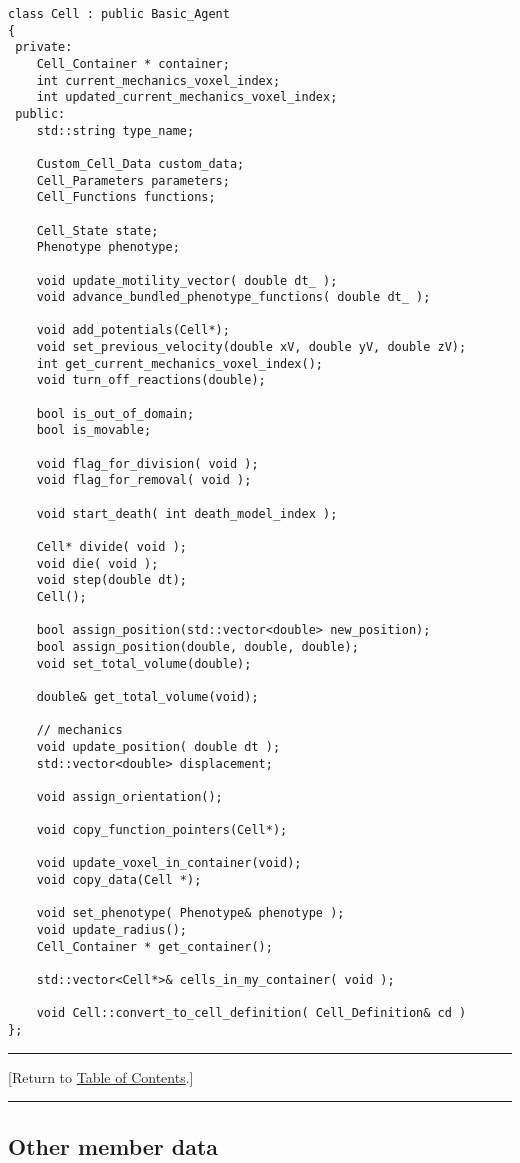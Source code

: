 \documentclass[12pt]{article}
\newcommand{\TOClink}{\begin{center}\hrule\vskip-10pt\phantom{.}\hfill[Return to \hyperlink{TOC}{Table of Contents}.]\hfill\phantom{.}\vskip3pt\hrule\end{center}}
\begin{document}
\begin{verbatim}
class Cell : public Basic_Agent 
{
 private: 
    Cell_Container * container;
    int current_mechanics_voxel_index;
    int updated_current_mechanics_voxel_index; 
 public:
    std::string type_name; 
 
    Custom_Cell_Data custom_data;
    Cell_Parameters parameters;
    Cell_Functions functions; 

    Cell_State state; 
    Phenotype phenotype; 
    
    void update_motility_vector( double dt_ );
    void advance_bundled_phenotype_functions( double dt_ ); 
    
    void add_potentials(Cell*);
    void set_previous_velocity(double xV, double yV, double zV);
    int get_current_mechanics_voxel_index();
    void turn_off_reactions(double);  
    
    bool is_out_of_domain;
    bool is_movable;
    
    void flag_for_division( void );   
    void flag_for_removal( void );   
	
    void start_death( int death_model_index ); 

    Cell* divide( void );
    void die( void );
    void step(double dt);
    Cell();
    
    bool assign_position(std::vector<double> new_position);
    bool assign_position(double, double, double);
    void set_total_volume(double);

    double& get_total_volume(void);
    
    // mechanics 
    void update_position( double dt );  
    std::vector<double> displacement; 

    void assign_orientation();  
    
    void copy_function_pointers(Cell*);
    
    void update_voxel_in_container(void);
    void copy_data(Cell *);

    void set_phenotype( Phenotype& phenotype );  
    void update_radius();
    Cell_Container * get_container();
    
    std::vector<Cell*>& cells_in_my_container( void ); 
    
    void Cell::convert_to_cell_definition( Cell_Definition& cd )
};
\end{verbatim}

\TOClink

\subsection{Other member data}
\label{sec:cell_other_member_data}
\end{document}
